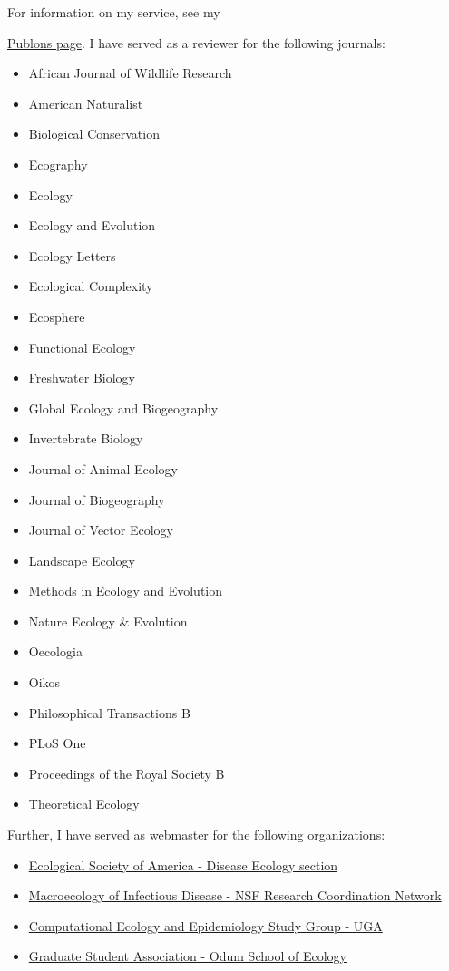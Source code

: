 \documentclass[]{CV}
\begin{document}
For information on my service, see my {\href{https://publons.com/author/904038/tad-dallas#profile}{Publons page}. I have served as a reviewer for the following journals:

\begin{multicols}{2}
\begin{itemize}
 \item African Journal of Wildlife Research
 \item American Naturalist
 \item Biological Conservation
 \item Ecography
 \item Ecology
 \item Ecology and Evolution
 \item Ecology Letters
 \item Ecological Complexity
 \item Ecosphere
 \item Functional Ecology
 \item Freshwater Biology
 \item Global Ecology and Biogeography
 \item Invertebrate Biology
 \item Journal of Animal Ecology
 \item Journal of Biogeography
 \item Journal of Vector Ecology
 \item Landscape Ecology
 \item Methods in Ecology and Evolution
 \item Nature Ecology \& Evolution
 \item Oecologia
 \item Oikos
 \item Philosophical Transactions B
 \item PLoS One
 \item Proceedings of the Royal Society B
 \item Theoretical Ecology
\end{itemize}
\end{multicols}



Further, I have served as webmaster for the following organizations:

\begin{itemize}
 \item  {\href{http://esa.org/disease}{Ecological Society of America - Disease Ecology section}}
 \item  {\href{http://diseasemacroecology.ecology.uga.edu/}{Macroecology of Infectious Disease - NSF Research Coordination Network}}
 \item  {\href{http://daphnia.ecology.uga.edu/ceesg}{Computational Ecology and Epidemiology Study Group - UGA}}
 \item  {\href{http://gsa.ecology.uga.edu}{Graduate Student Association - Odum School of Ecology}}
\end{itemize}






}
\end{document}
